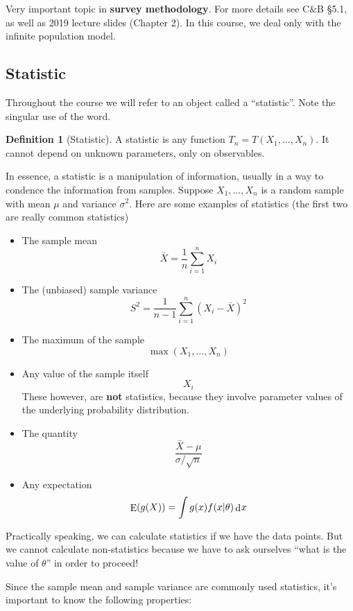 \documentclass[
]{book}
\DeclareMathOperator{\E}{E}
\DeclareMathOperator{\dd}{d}
\newcommand{\dint}{\dd\hspace{0.5pt}\!}
\theoremstyle{definition}
\newtheorem{definition}{Definition}[chapter]
\theoremstyle{definition}
\theoremstyle{definition}
\theoremstyle{definition}
\theoremstyle{remark}
\begin{document}
Very important topic in \textbf{survey methodology}.
For more details see C\&B §5.1, as well as 2019 lecture slides (Chapter 2).
In this course, we deal only with the infinite population model.

\hypertarget{statistic}{%
\subsection{Statistic}\label{statistic}}

Throughout the course we will refer to an object called a ``statistic''. Note the singular use of the word.

\begin{definition}[Statistic]
A statistic is any function \(T_n = T(X_1,\dots,X_n)\). It cannot depend on unknown parameters, only on observables.
\end{definition}

In essence, a statistic is a manipulation of information, usually in a way to condence the information from samples.
Suppose \(X_1,\dots,X_n\) is a random sample with mean \(\mu\) and variance \(\sigma^2\).
Here are some examples of statistics (the first two are really common statistics)

\begin{itemize}
\item
  The sample mean
  \[
  \bar X = \frac{1}{n}\sum_{i=1}^n X_i
  \]
\item
  The (unbiased) sample variance
  \[
  S^2 = \frac{1}{n-1}\sum_{i=1}^n (X_i-\bar X)^2
  \]
\item
  The maximum of the sample
  \[
  \max(X_1,\dots,X_n)
  \]
\item
  Any value of the sample itself
  \[
  X_i
  \]
  These however, are \textbf{not} statistics, because they involve parameter values of the underlying probability distribution.
\item
  The quantity
  \[
  \frac{\bar X - \mu}{\sigma/\sqrt n}
  \]
\item
  Any expectation
  \[
  \E(g(X)) = \int g(x) f(x|\theta)\dint x
  \]
\end{itemize}

Practically speaking, we can calculate statistics if we have the data points.
But we cannot calculate non-statistics because we have to ask ourselves ``what is the value of \(\theta\)'' in order to proceed!

Since the sample mean and sample variance are commonly used statistics, it's important to know the following properties:
\end{document}
